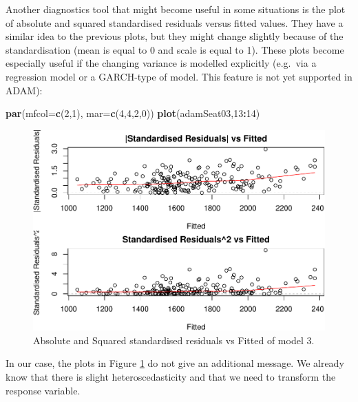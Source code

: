 \documentclass[]{book}
\newenvironment{Shaded}{\begin{snugshade}}{\end{snugshade}}
\newcommand{\DataTypeTok}[1]{\textcolor[rgb]{0.13,0.29,0.53}{#1}}
\newcommand{\DecValTok}[1]{\textcolor[rgb]{0.00,0.00,0.81}{#1}}
\newcommand{\KeywordTok}[1]{\textcolor[rgb]{0.13,0.29,0.53}{\textbf{#1}}}
\newcommand{\NormalTok}[1]{#1}
\newcommand{\OperatorTok}[1]{\textcolor[rgb]{0.81,0.36,0.00}{\textbf{#1}}}
\theoremstyle{definition}
\theoremstyle{definition}
\theoremstyle{definition}
\theoremstyle{definition}
\theoremstyle{remark}
\begin{document}
Another diagnostics tool that might become useful in some situations is the plot of absolute and squared standardised residuals versus fitted values. They have a similar idea to the previous plots, but they might change slightly because of the standardisation (mean is equal to 0 and scale is equal to 1). These plots become especially useful if the changing variance is modelled explicitly (e.g.~via a regression model or a GARCH-type of model. This feature is not yet supported in ADAM):

\begin{Shaded}
\begin{Highlighting}[]
\KeywordTok{par}\NormalTok{(}\DataTypeTok{mfcol=}\KeywordTok{c}\NormalTok{(}\DecValTok{2}\NormalTok{,}\DecValTok{1}\NormalTok{), }\DataTypeTok{mar=}\KeywordTok{c}\NormalTok{(}\DecValTok{4}\NormalTok{,}\DecValTok{4}\NormalTok{,}\DecValTok{2}\NormalTok{,}\DecValTok{0}\NormalTok{))}
\KeywordTok{plot}\NormalTok{(adamSeat03,}\DecValTok{13}\OperatorTok{:}\DecValTok{14}\NormalTok{)}
\end{Highlighting}
\end{Shaded}

\begin{figure}
\centering
\includegraphics{Svetunkov--2022----ADAM_files/figure-latex/adamSeat03HeteroStd-1.pdf}
\caption{\label{fig:adamSeat03HeteroStd}Absolute and Squared standardised residuals vs Fitted of model 3.}
\end{figure}

In our case, the plots in Figure \ref{fig:adamSeat03HeteroStd} do not give an additional message. We already know that there is slight heteroscedasticity and that we need to transform the response variable.
\end{document}
